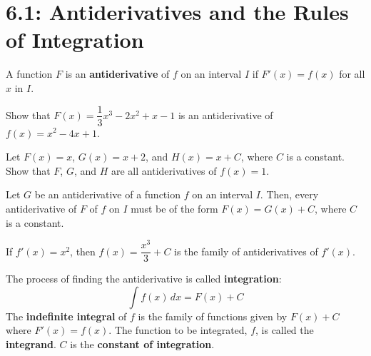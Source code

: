 \documentclass[../mathNotesPreamble]{subfiles}
\providecommand{\relscalefact}{1.4}
\begin{document}
\relscale{\relscalefact}
  \section{6.1: Antiderivatives and the Rules of Integration}
  \begin{defn*}[Antiderivatives]
    A function $F$ is an \textbf{antiderivative} of $f$ on an interval $I$ if $F'(x)=f(x)$ for all $x$ in $I$.
  \end{defn*}
  \begin{ex*}
    Show that $F(x)=\dfrac{1}{3}x^3-2x^2+x-1$ is an antiderivative of $f(x)=x^2-4x+1$.
  \end{ex*}
  \begin{ex*}
    Let $F(x)=x$, $G(x)=x+2$, and $H(x)=x+C$, where $C$ is a constant. Show that $F$, $G$, and $H$ are all antiderivatives of $f(x)=1$.
  \end{ex*}
  \pagebreak

  \begin{thmBox*}[Theorem 1]
    Let $G$ be an antiderivative of a function $f$ on an interval $I$. Then, every antiderivative of $F$ of $f$ on $I$ must be of the form $F(x)=G(x)+C$, where $C$ is a constant.
  \end{thmBox*}

  \begin{ex*}
    If $f'(x)=x^2$, then $f(x)=\dfrac{x^3}{3}+C$ is the family of antiderivatives of $f'(x)$.
  \end{ex*}

  \begin{center}
  \end{center}
  \begin{defn*}[Integration]
    The process of finding the antiderivative is called \textbf{integration}:
    \[\int f(x)\,dx= F(x)+C\]
    The \textbf{indefinite integral} of $f$ is the family of functions given by $F(x)+C$ where $F'(x)=f(x)$. The function to be integrated, $f$, is called the \textbf{integrand}. $C$ is the \textbf{constant of integration}.
  \end{defn*}
  \pagebreak
\end{document}
